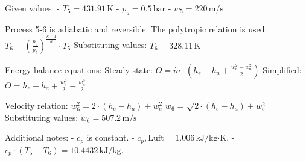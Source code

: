 Given values:  
- \( T_5 = 431.91 \, \text{K} \)  
- \( p_5 = 0.5 \, \text{bar} \)  
- \( w_5 = 220 \, \text{m/s} \)  

Process 5-6 is adiabatic and reversible.  
The polytropic relation is used:  
\( T_6 = \left( \frac{p_6}{p_5} \right)^{\frac{\kappa - 1}{\kappa}} \cdot T_5 \)  
Substituting values:  
\( T_6 = 328.11 \, \text{K} \)  

Energy balance equations:  
Steady-state:  
\( O = \dot{m} \cdot (h_e - h_a + \frac{w_e^2 - w_a^2}{2}) \)  
Simplified:  
\( O = h_e - h_a + \frac{w_e^2}{2} - \frac{w_a^2}{2} \)  

Velocity relation:  
\( w_6^2 = 2 \cdot (h_e - h_a) + w_e^2 \)  
\( w_6 = \sqrt{2 \cdot (h_e - h_a) + w_e^2} \)  
Substituting values:  
\( w_6 = 507.2 \, \text{m/s} \)  

Additional notes:  
- \( c_p \) is constant.  
- \( c_p, \text{Luft} = 1.006 \, \text{kJ/kg·K} \).  
- \( c_p \cdot (T_5 - T_6) = 10.4432 \, \text{kJ/kg} \).